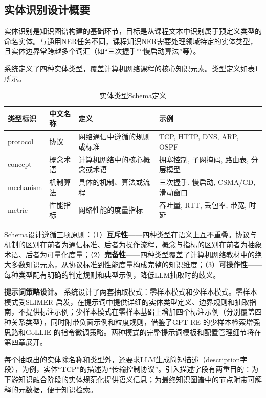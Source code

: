 \subsection{实体识别设计概要}

实体识别是知识图谱构建的基础环节，目标是从课程文本中识别属于预定义类型的命名实体。与通用NER任务不同，课程知识NER需要处理领域特定的实体类型，且实体边界常跨越多个词汇（如“三次握手”“慢启动算法”等）。

系统定义了四种实体类型，覆盖计算机网络课程的核心知识元素。类型定义如表\ref{tab:3-1}所示。

\begin{table}[ht]
    \centering
    \caption{实体类型Schema定义}\label{tab:3-1}
    \small
    \begin{tabular}{p{2.0cm}p{2.0cm}p{4.5cm}p{3.6cm}}
    \toprule
    \textbf{类型标识} & \textbf{中文名称} & \textbf{定义} & \textbf{示例} \\
    \midrule
    protocol & 协议 & 网络通信中遵循的规则或标准 & TCP, HTTP, DNS, ARP, OSPF \\
    concept & 概念术语 & 计算机网络中的核心概念或术语 & 拥塞控制, 子网掩码, 路由表, 分层模型 \\
    mechanism & 机制算法 & 具体的机制、算法或流程 & 三次握手, 慢启动, CSMA/CD, 滑动窗口 \\
    metric & 性能指标 & 网络性能的度量指标 & 吞吐量, RTT, 丢包率, 带宽, 时延 \\
    \bottomrule
    \end{tabular}
\end{table}

Schema设计遵循三项原则：（1）\textbf{互斥性}——四种类型在语义上互不重叠。协议与机制的区别在前者为通信标准、后者为操作流程，概念与指标的区别在前者为抽象术语、后者为可量化度量；（2）\textbf{完备性}——四种类型覆盖了计算机网络教材中的绝大多数知识元素，从协议标准到性能度量构成完整的知识维度；（3）\textbf{可操作性}——每种类型配有明确的判定规则和典型示例，降低LLM抽取时的歧义。

\textbf{提示词策略设计。} 系统设计了两套抽取模式：零样本模式和少样本模式。零样本模式受SLIMER\cite{slimer_2024} 启发，在提示词中提供详细的实体类型定义、边界规则和抽取指南，不提供标注示例；少样本模式在零样本基础上增加四个标注示例（分别覆盖四种关系类型），同时附带负面示例和粒度规则，借鉴了GPT-RE\cite{gpt_re_2023} 的少样本检索增强思路和GoLLIE\cite{gollie_2023} 的指令微调策略。两种模式的完整提示词模板和配置管理细节将在第四章展开。

每个抽取出的实体除名称和类型外，还要求LLM生成简短描述（description字段），为例，实体“TCP”的描述为“传输控制协议”。引入描述字段有两重目的：为下游知识融合阶段的实体规范化提供语义信息；为最终知识图谱中的节点附带可解释的元数据，便于知识检索。

